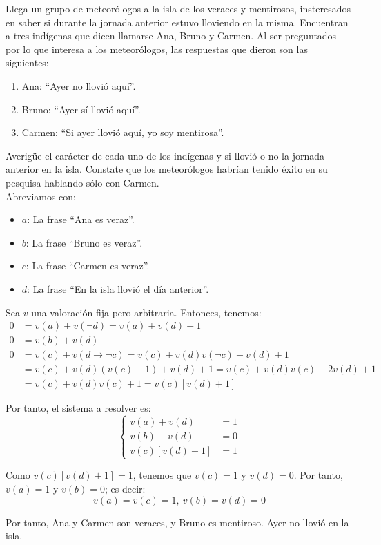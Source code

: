 \begin{ejercicio}
    Llega un grupo de meteorólogos a la isla de los veraces y mentirosos, insteresados en saber si durante
    la jornada anterior estuvo lloviendo en la misma. Encuentran a tres indígenas que dicen llamarse
    Ana, Bruno y Carmen. Al ser preguntados por lo que interesa a los meteorólogos, las respuestas
    que dieron son las siguientes:
    \begin{enumerate}
        \item Ana: ``Ayer no llovió aquí''.
        \item Bruno: ``Ayer sí llovió aquí''.
        \item Carmen: ``Si ayer llovió aquí, yo soy mentirosa''.
    \end{enumerate}
    Averigüe el carácter de cada uno de los indígenas y si llovió o no la jornada anterior en la isla.
    Constate que los meteorólogos habrían tenido éxito en su pesquisa hablando sólo con Carmen.\\

    Abreviamos con:
    \begin{itemize}
        \item $a$: La frase ``Ana es veraz''.
        \item $b$: La frase ``Bruno es veraz''.
        \item $c$: La frase ``Carmen es veraz''.
        \item $d$: La frase ``En la isla llovió el día anterior''.
    \end{itemize}

    Sea $v$ una valoración fija pero arbitraria. Entonces, tenemos:
    \begin{align*}
        0 &= v(a) + v(\lnot d) = v(a) + v(d)+1\\
        0 &= v(b) + v(d)\\
        0 &= v(c) + v(d\rightarrow\lnot c) = v(c) +v(d)v(\lnot c) + v(d) + 1\\
        &= v(c) +v(d)(v(c)+1) + v(d) + 1 = v(c) +v(d)v(c) + 2v(d) + 1\\
        &= v(c) +v(d)v(c) + 1 = v(c)[v(d)+1]
    \end{align*}

    Por tanto, el sistema a resolver es:
    \begin{equation*}
        \left\{
            \begin{aligned}
                v(a) + v(d) &= 1\\
                v(b) + v(d) &= 0\\
                v(c)[v(d)+1] &= 1
            \end{aligned}
        \right.
    \end{equation*}

    Como $v(c)[v(d)+1]=1$, tenemos que $v(c)=1$ y $v(d)=0$.
    Por tanto, $v(a)=1$ y $v(b)=0$; es decir:
    \begin{equation*}
        v(a)=v(c)=1,~v(b)=v(d)=0
    \end{equation*}

    Por tanto, Ana y Carmen son veraces, y Bruno es mentiroso. Ayer no llovió en la isla.
\end{ejercicio}


